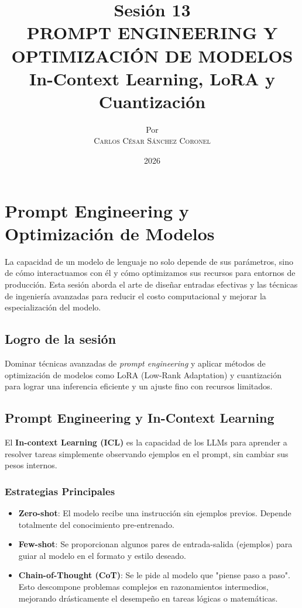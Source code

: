 \documentclass[12pt,a4paper,openany,oneside]{book}
\title{
    \textbf{Sesión 13} \\ 
    \Huge \textbf{PROMPT ENGINEERING Y OPTIMIZACIÓN DE MODELOS} \\
    \Large In-Context Learning, LoRA y Cuantización
}
\author{
    \small Por \\ \vspace{0.2cm}
    \Large \textsc{Carlos César Sánchez Coronel}
}
\date{2026}
\begin{document}
\maketitle
\tableofcontents
{}

\chapter{Prompt Engineering y Optimización de Modelos}

La capacidad de un modelo de lenguaje no solo depende de sus parámetros, sino de cómo interactuamos con él y cómo optimizamos sus recursos para entornos de producción. Esta sesión aborda el arte de diseñar entradas efectivas y las técnicas de ingeniería avanzadas para reducir el costo computacional y mejorar la especialización del modelo.

\section{Logro de la sesión}
Dominar técnicas avanzadas de \textit{prompt engineering} y aplicar métodos de optimización de modelos como LoRA (Low-Rank Adaptation) y cuantización para lograr una inferencia eficiente y un ajuste fino con recursos limitados.

\section{Prompt Engineering y In-Context Learning}

El \textbf{In-context Learning (ICL)} es la capacidad de los LLMs para aprender a resolver tareas simplemente observando ejemplos en el prompt, sin cambiar sus pesos internos.

\subsection{Estrategias Principales}
\begin{itemize}
    \item \textbf{Zero-shot}: El modelo recibe una instrucción sin ejemplos previos. Depende totalmente del conocimiento pre-entrenado.
    \item \textbf{Few-shot}: Se proporcionan algunos pares de entrada-salida (ejemplos) para guiar al modelo en el formato y estilo deseado.
    \item \textbf{Chain-of-Thought (CoT)}: Se le pide al modelo que "piense paso a paso". Esto descompone problemas complejos en razonamientos intermedios, mejorando drásticamente el desempeño en tareas lógicas o matemáticas.
\end{itemize}
\end{document}
